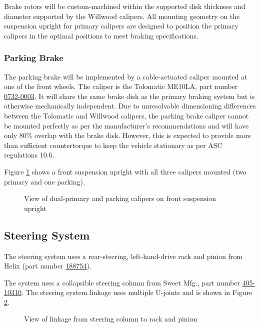 \documentclass[10pt]{article}
\begin{document}
Brake rotors will be custom-machined within the supported disk thickness and diameter supported by the Willwood calipers. All mounting geometry on the suspension upright for primary calipers are designed to position the primary calipers in the optimal positions to meet braking specifications.

\subsubsection{Parking Brake}
The parking brake will be implemented by a cable-actuated caliper mounted at one of the front wheels. The caliper is the Tolomatic ME10LA, part number \href{https://www.tolomatic.com/products/product-details/me10-mechanical-disc-brake#/specs-order}{0732-0003}. It will share the same brake disk as the primary braking system but is otherwise mechanically independent. Due to unresolvable dimensioning differences between the Tolomatic and Willwood calipers, the parking brake caliper cannot be mounted perfectly as per the manufacturer's recommendations and will have only 80\% overlap with the brake disk. However, this is expected to provide more than sufficient countertorque to keep the vehicle stationary as per ASC regulations 10.6.

Figure \ref{fig:calipers-mounting-geometry} shows a front suspension upright with all three calipers mounted (two primary and one parking).

\begin{figure}
\centering
\caption{View of dual-primary and parking calipers on front suspension upright }
\label{fig:calipers-mounting-geometry}
\end{figure}

\subsection{Steering System}
The steering system uses a rear-steering, left-hand-drive rack and pinion from Helix (part number \href{http://www.helixsuspension.com/catalog/Steering/Manual-Steering-Racks/HEXSR5/Omni-Manual-Steering-Rack---Rear-Steering}{188754}). 

The system uses a collapsible steering column from Sweet Mfg.\@, part number \href{https://sweetmfg.biz/product.php?productid=2836}{405-10310}. The steering system linkage uses multiple U-joints and is shown in Figure \ref{fig:steering-system}.

\begin{figure}
\centering
\caption{View of linkage from steering column to rack and pinion}
\label{fig:steering-system}
\end{figure}
\end{document}
